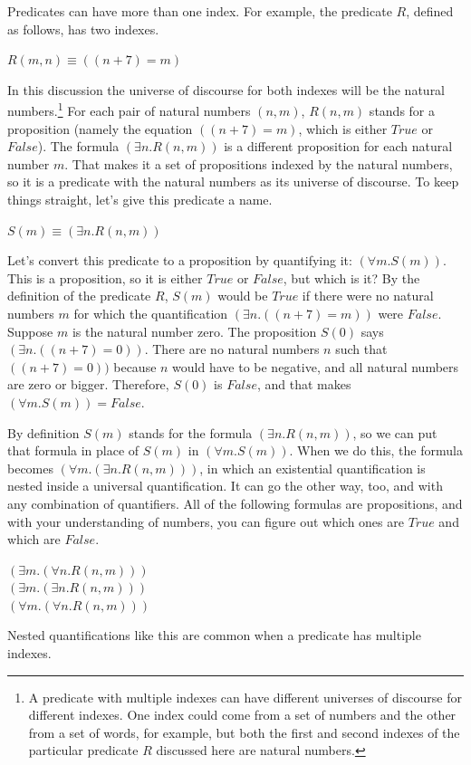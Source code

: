 {{Predicates can have more than one index.
For example, the predicate $R$,
defined as follows, has two indexes.
\begin{center}
$R(m, n) \equiv ((n + 7) = m)$
\end{center}
In this discussion the universe of discourse
for both indexes will be the natural numbers.\footnote{A
predicate with multiple indexes can
have different universes of discourse for different indexes.
One index could come from a set of numbers
and the other from a set of words, for example,
but both the first and second indexes
of the particular predicate $R$ discussed here
are natural numbers.}
For each pair of natural numbers $(n, m)$,
$R(n, m)$ stands for a proposition (namely the
equation $((n + 7) = m)$, which is either $True$ or $False$).
The formula $(\exists n.R(n,m))$ is a different
proposition for each natural number $m$.
That makes it a set of propositions indexed by the natural numbers,
so it is a predicate with the natural numbers as its universe of discourse.
To keep things straight, let's give this predicate a name.
\begin{center}
$S(m) \equiv (\exists n.R(n,m))$
\end{center}

Let's convert this predicate to a proposition by quantifying it:
$(\forall m.S(m))$. This is a proposition, so
it is either $True$ or $False$, but which is it?
By the definition of the predicate $R$,
$S(m)$ would be $True$ if there were no natural numbers $m$
for which the quantification $(\exists n.((n+7) = m))$ were $False$.
Suppose $m$ is the natural number zero.
The proposition $S(0)$ says $(\exists n.((n+7) = 0))$.
There are no natural numbers $n$ such that
$((n+7) = 0))$ because $n$ would have to be negative,
and all natural numbers are zero or bigger.
Therefore, $S(0)$ is $False$,
and that makes $(\forall m.S(m)) = False$.

By definition
$S(m)$ stands for the formula $(\exists n.R(n,m))$,
so we can put that formula in place of $S(m)$
in $(\forall m.S(m))$. When we do this,
the formula becomes $(\forall m.(\exists n.R(n,m)))$,
in which an existential quantification
is nested inside a universal quantification.
It can go the other way, too, and with any
combination of quantifiers.
All of the following formulas are propositions,
and with your understanding of numbers, you
can figure out which ones are $True$ and
which are $False$.
\begin{center}
$(\exists m.(\forall n.R(n,m)))$ \\
$(\exists m.(\exists n.R(n,m)))$ \\
$(\forall m.(\forall n.R(n,m)))$
\end{center}
Nested quantifications like this are common
when a predicate has multiple indexes.

}}

